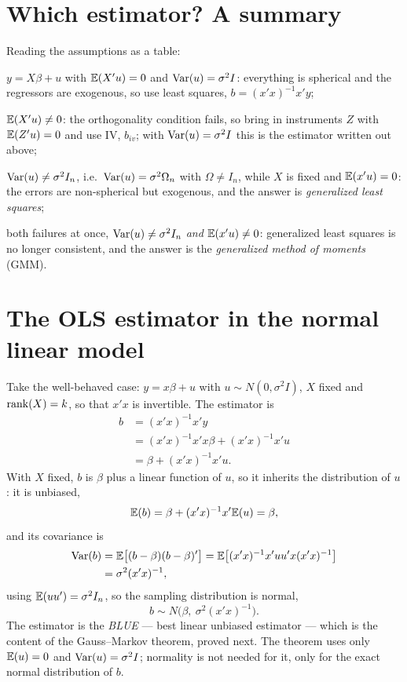 \documentclass[11pt]{article}
\begin{document}
\section{Which estimator? A summary}

Reading the assumptions as a table:

\begin{flatlist}
  \item $y=X\beta+u$ with $\mathbb{E}(X'u)=0$ and $\operatorname{Var}(u)=\sigma^{2}I$: everything is
        spherical and the regressors are exogenous, so use least squares,
        $b=(x'x)^{-1}x'y$;
  \item $\mathbb{E}(X'u)\ne0$: the orthogonality condition fails, so bring in instruments
        $Z$ with $\mathbb{E}(Z'u)=0$ and use IV, $b_{iv}$; with $\operatorname{Var}(u)=\sigma^{2}I$ this is
        the estimator written out above;
  \item $\operatorname{Var}(u)\ne\sigma^{2}I_n$, i.e.\ $\operatorname{Var}(u)=\sigma^{2}\Omega_n$ with
        $\Omega\ne I_n$, while $X$ is fixed and $\mathbb{E}(x'u)=0$: the errors are
        non-spherical but exogenous, and the answer is \emph{generalized least
        squares};
  \item both failures at once, $\operatorname{Var}(u)\ne\sigma^{2}I_n$ \emph{and}
        $\mathbb{E}(x'u)\ne0$: generalized least squares is no longer consistent, and the
        answer is the \emph{generalized method of moments} (GMM).
\end{flatlist}

\section{The OLS estimator in the normal linear model}

Take the well-behaved case: $y=x\beta+u$ with $u\sim N(0,\sigma^{2}I)$, $X$ fixed and
$\operatorname{rank}(X)=k$, so that $x'x$ is invertible. The estimator is
\[
\begin{aligned}
  b&=(x'x)^{-1}x'y\\
   &=(x'x)^{-1}x'x\beta+(x'x)^{-1}x'u\\
   &=\beta+(x'x)^{-1}x'u .
\end{aligned}
\]
With $X$ fixed, $b$ is $\beta$ plus a linear function of $u$, so it inherits the
distribution of $u$: it is unbiased,
\[ \mathbb{E}(b)=\beta+(x'x)^{-1}x'\mathbb{E}(u)=\beta, \]
and its covariance is
\[
\begin{aligned}
  \operatorname{Var}(b)&=\mathbb{E}\bigl[(b-\beta)(b-\beta)'\bigr]
          =\mathbb{E}\bigl[(x'x)^{-1}x'uu'x(x'x)^{-1}\bigr]\\
         &=\sigma^{2}(x'x)^{-1},
\end{aligned}
\]
using $\mathbb{E}(uu')=\sigma^{2}I_n$, so the sampling distribution is normal,
\[ b\sim N\bigl(\beta,\ \sigma^{2}(x'x)^{-1}\bigr) . \]
The estimator is the \emph{BLUE} --- best linear unbiased estimator --- which is
the content of the Gauss--Markov theorem, proved next. The theorem uses only
$\mathbb{E}(u)=0$ and $\operatorname{Var}(u)=\sigma^{2}I$; normality is not needed for it, only for the
exact normal distribution of $b$.
\end{document}
